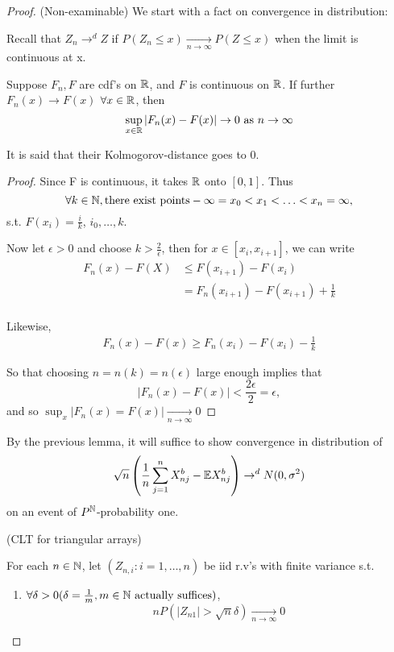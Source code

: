 \documentclass[a4paper]{article}
\begin{document}
\begin{proof} (Non-examinable)
	We start with a fact on convergence in distribution:
	
	Recall that $Z_n \to ^{d} Z$ if $P\left( Z_n \le x \right) \underset{n\to \infty}{\to } P\left( Z \le x \right)$ when the limit is continuous at x. 

	\begin{lemma}
		Suppose $F_n, F$ are cdf's on $\mathbb{R}$, and $F$ is continuous on $\mathbb{R}$. If further  $F_n(x) \to F(x)$ $\forall x \in \mathbb{R}$, then 
		\[
			\sup_{x \in \mathbb{R}} |F_n(x) - F(x)| \to 0 \text{ as } n\to \infty
		\]

		It is said that their Kolmogorov-distance goes to $0$.
	\end{lemma}

	\begin{proof}
		Since F is continuous, it takes $\mathbb{R}$ onto $[0,1]$. Thus 
		\[
			\forall k \in \mathbb{N}, \text{there exist points} -\infty = x_0 < x_1 < \ldots < x_n = \infty
		,\] s.t. $F(x_i) = \frac{i}{k}$, $i_0,\ldots,k$.

		Now let $\epsilon > 0$ and choose $k > \frac{2}{\epsilon}$, then for $x \in [x_i, x_{i+1}]$, we can write
		\begin{align*}
			F_n(x) - F(X) &\le  F(x_{i+1}) - F(x_i) \\
				      &= F_n(x_{i+1}) - F(x_{i+1}) + \frac{1}{k} \\
		\end{align*}
		
		Likewise,
		\begin{align*}
			F_n(x) - F(x) \ge F_n(x_i) - F(x_i) - \frac{1}{k}
		\end{align*}

		So that choosing $n = n(k) = n(\epsilon)$ large enough implies that
		\[
			|F_n(x) - F(x)| < \frac{2\epsilon}{2} = \epsilon
		,\]
		and so $\sup_x |F_n(x) = F(x)| \underset{n\to \infty}{\to } 0$

	\end{proof}

	By the previous lemma, it will suffice to show convergence in distribution of 
	 \[
		 \sqrt{n}\left( \frac{1}{n} \sum_{j=1}^{n} X_{nj}^{b} - \mathbb{E} X_{nj}^{b} \right) \to ^{d} N(0, \sigma^2)  
	\]
	on an event of $P^{\mathbb{N}}$-probability one. 

	\begin{prop} (CLT for triangular arrays)
		
		For each $n \in \mathbb{N}$, let $(Z_{n,i} : i = 1,\ldots,n)$ be iid r.v's with finite variance s.t.
		\begin{enumerate}
			\item $\forall \delta > 0 (\delta = \frac{1}{m}, m \in \mathbb{N} \text{ actually suffices})$, \[
					n P\left( |Z_{n1}| > \sqrt{n}\delta  \right) \underset{n\to \infty}{\to } 0
	\]


\end{enumerate}
\end{prop}
\end{proof}
\end{document}
